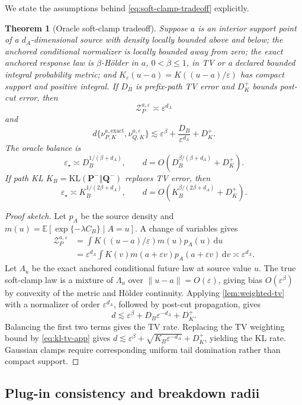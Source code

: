 \documentclass{article}
\newcommand{\E}{\mathbb E}
\newcommand{\KL}{\mathrm{KL}}
\newcommand{\Z}{\mathcal Z}
\newcommand{\PathP}{\mathbf P}
\newcommand{\PathQ}{\mathbf Q}
\newcommand{\eps}{\varepsilon}
\newcommand{\dd}{\,\mathrm d}
\newtheorem{theorem}[definition]{Theorem}
\theoremstyle{remark}
\begin{document}
We state the assumptions behind \cref{eq:soft-clamp-tradeoff} explicitly.

\begin{theorem}[Oracle soft-clamp tradeoff]
\label{thm:soft-clamp-app}
Suppose \(a\) is an interior support point of a \(d_A\)-dimensional source with
density locally bounded above and below; the anchored conditional normalizer
is locally bounded away from zero; the exact anchored response law is
\(\beta\)-H\"older in \(a\), \(0<\beta\leq1\), in TV or a declared bounded
integral probability metric; and
\(K_\eps(u-a)=K((u-a)/\eps)\) has compact support and positive integral. If
\(D_B\) is prefix-path TV error and \(D_K^+\) bounds post-cut error, then
\[
  \Z_P^{a,\eps}\asymp\eps^{d_A}
\]
and
\[
  d\{\nu_{P,K}^{a,\mathrm{exact}},
      \nu_{Q,K}^{a,\eps}\}
  \lesssim
  \eps^\beta+\frac{D_B}{\eps^{d_A}}+D_K^+.
\]
The oracle balance is
\[
  \eps_\star\asymp D_B^{1/(\beta+d_A)},
  \qquad
  d=
  O\!\left(
    D_B^{\beta/(\beta+d_A)}+D_K^+
  \right).
\]
If path KL \(K_B=\KL(\PathP^-\Vert\PathQ^-)\) replaces TV error, then
\[
  \eps_\star\asymp K_B^{1/(2\beta+d_A)},
  \qquad
  d=
  O\!\left(
    K_B^{\beta/(2\beta+d_A)}+D_K^+
  \right).
\]
\end{theorem}

\begin{proof}[Proof sketch]
Let \(p_A\) be the source density and
\(m(u)=\E[\exp\{-\lambda C_B\}\mid A=u]\). A change of variables gives
\[
\begin{split}
  \Z_P^{a,\eps}
  &=
  \int K((u-a)/\eps)m(u)p_A(u)\dd u\\
  &=
  \eps^{d_A}
  \int K(v)m(a+\eps v)p_A(a+\eps v)\dd v
  \asymp\eps^{d_A}.
\end{split}
\]
Let \(\Lambda_u\) be the exact anchored conditional future law at source value
\(u\). The true soft-clamp law is a mixture of \(\Lambda_u\) over
\(\|u-a\|=O(\eps)\), giving bias \(O(\eps^\beta)\) by convexity of the metric
and H\"older continuity. Applying \cref{lem:weighted-tv} with a normalizer of
order \(\eps^{d_A}\), followed by post-cut propagation, gives
\[
  d
  \lesssim
  \eps^\beta+D_B\eps^{-d_A}+D_K^+.
\]
Balancing the first two terms gives the TV rate. Replacing the TV weighting
bound by \cref{eq:kl-tv-app} gives
\(d\lesssim\eps^\beta+\sqrt{K_B\eps^{-d_A}}+D_K^+\), yielding the KL rate.
Gaussian clamps require corresponding uniform tail domination rather than
compact support.
\end{proof}

\subsection{Plug-in consistency and breakdown radii}
\end{document}
